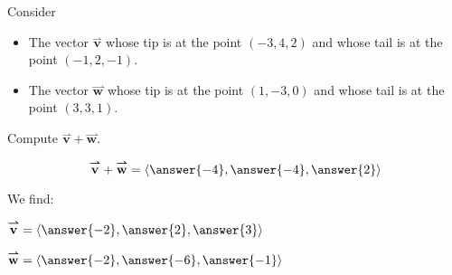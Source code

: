 \documentclass{ximera}
\author{Bart Snapp}
\begin{document}
\begin{exercise}
  Consider
  \begin{itemize}
    \item The vector $\overset{\boldsymbol{\rightharpoonup}}{\mathbf{v}}$ whose tip is at the point $(-3,4,2)$
      and whose tail is at the point $(-1,2,-1)$.
    \item The vector $\overset{\boldsymbol{\rightharpoonup}}{\mathbf{w}}$ whose tip is at the point $(1,-3,0)$
      and whose tail is at the point $(3,3,1)$.
  \end{itemize}
  Compute $\overset{\boldsymbol{\rightharpoonup}}{\mathbf{v}}+\overset{\boldsymbol{\rightharpoonup}}{\mathbf{w}}$.
  \begin{prompt}
    \[
    \overset{\boldsymbol{\rightharpoonup}}{\mathbf{v}} + \overset{\boldsymbol{\rightharpoonup}}{\mathbf{w}} = \left\langle \answer{-4},\answer{-4},\answer{2} \right\rangle
    \]
  \end{prompt}
  
  \begin{hint}
  We find:
  
  $\overset{\boldsymbol{\rightharpoonup}}{\mathbf{v}} = \left\langle \answer{-2} , \answer{2} , \answer{3} \right\rangle$
  
  $\overset{\boldsymbol{\rightharpoonup}}{\mathbf{w}} = \left\langle \answer{-2} , \answer{-6} , \answer{-1} \right\rangle$
  \end{hint}
  
\end{exercise}
\end{document}

